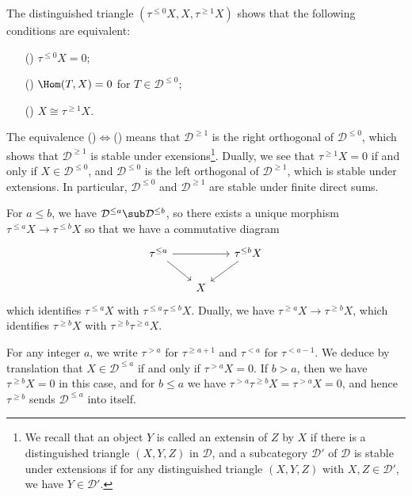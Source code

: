 The distinguished triangle $(\tau^{\leq 0}X,X,\tau^{\geq 1}X)$ shows that the following conditions are equivalent:
\begin{enumerate}
    \item[(\rmnum{1})] $\tau^{\leq 0}X=0$;
    \item[(\rmnum{2})] $\Hom(T,X)=0$ for $T\in\mathcal{D}^{\leq 0}$;
    \item[(\rmnum{3})] $X\cong\tau^{\geq 1}X$.
\end{enumerate}
The equivalence ()$\Leftrightarrow$() means that $\mathcal{D}^{\geq 1}$ is the right orthogonal of $\mathcal{D}^{\leq 0}$, which shows that $\mathcal{D}^{\geq 1}$ is stable under exensions\footnote{We recall that an object $Y$ is called an extensin of $Z$ by $X$ if there is a distinguished triangle $(X,Y,Z)$ in $\mathcal{D}$, and a subcategory $\mathcal{D}'$ of $\mathcal{D}$ is stable under extensions if for any distinguished triangle $(X,Y,Z)$ with $X,Z\in\mathcal{D}'$, we have $Y\in\mathcal{D}'$.}. Dually, we see that $\tau^{\geq 1}X=0$ if and only if $X\in\mathcal{D}^{\leq 0}$, and $\mathcal{D}^{\leq 0}$ is the left orthogonal of $\mathcal{D}^{\geq 1}$, which is stable under extensions. In particular, $\mathcal{D}^{\leq 0}$ and $\mathcal{D}^{\geq 1}$ are stable under finite direct sums.\par

For $a\leq b$, we have $\mathcal{D}^{\leq a}\sub\mathcal{D}^{\leq b}$, so there exists a unique morphism $\tau^{\leq a}X\to\tau^{\leq b}X$ so that we have a commutative diagram
\[\begin{tikzcd}[row sep=6mm,column sep=6mm]
\tau^{\leq a}\ar[rd]\ar[rr]&&\tau^{\leq b}X\ar[ld]\\
&X&
\end{tikzcd}\]
which identifies $\tau^{\leq a}X$ with $\tau^{\leq a}\tau^{\leq b}X$. Dually, we have $\tau^{\geq a}X\to\tau^{\geq b}X$, which identifies $\tau^{\geq b}X$ with $\tau^{\geq b}\tau^{\geq a}X$.\par
For any integer $a$, we write $\tau^{>a}$ for $\tau^{\geq a+1}$ and $\tau^{<a}$ for $\tau^{<a-1}$. We deduce by translation that $X\in\mathcal{D}^{\leq a}$ if and only if $\tau^{>a}X=0$. If $b>a$, then we have $\tau^{\geq b}X=0$ in this case, and for $b\leq a$ we have $\tau^{>a}\tau^{\geq b}X=\tau^{>a}X=0$, and hence $\tau^{\geq b}$ sends $\mathcal{D}^{\leq a}$ into itself.

